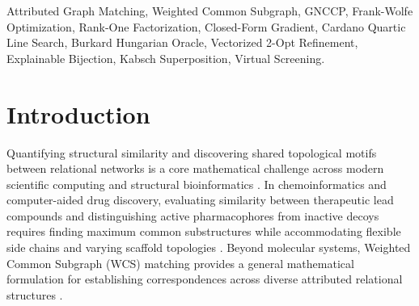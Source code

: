 \documentclass[conference]{IEEEtran}
\begin{document}
\begin{abstract}
$\mathcal{O}(N^{5.4})$ for prior GNCCP relaxations and $\mathcal{O}(N^{4.3})$ for classical spectral methods, running $19.3\times$ faster than RLX1 and scaling up to problem sizes $M = 60$ with sub-$25\,\text{ms}$ running times and $97.1\%$ matching accuracy. On real-world 3D molecular conformer benchmarks across 100 multi-seed trials evaluated with untrimmed full-atom RMSD, Fast-WCS achieves $49.8\%$ accuracy ($95\%$ CI: $[42.4, 57.1]\%$) with $\mathbf{42.0\%}$ sub-angstrom docking success ($< 1.0\,\text{\AA}$) in $30.7\,\text{ms}$, whereas optimal transport and quadratic assignment baselines (POT, FGW, SciPy FAQ) fail ($0.0\text{--}1.0\%$ sub-angstrom recovery, median RMSD $> 2.7\,\text{\AA}$). Finally, on pharmaceutical screening benchmarks (CYP19A1 Aromatase), Fast-WCS achieves an empirical $\mathbf{19.3\times}$ speedup over RLX1 (and up to $\mathbf{5,717.9\times}$ over numerical finite differences at $N = 100$) and produces a multi-scale hybrid kernel with superior screening enrichment (ROC-AUC = $0.884$, $\text{EF}_{1\%} = 8.5\times$ approaching the theoretical maximum ceiling of $10.0\times$ for a $10\%$ active base rate, compared to $6.4\times$ for ECFP4).
\end{abstract}

\begin{IEEEkeywords}
Attributed Graph Matching, Weighted Common Subgraph, GNCCP, Frank-Wolfe Optimization, Rank-One Factorization, Closed-Form Gradient, Cardano Quartic Line Search, Burkard Hungarian Oracle, Vectorized 2-Opt Refinement, Explainable Bijection, Kabsch Superposition, Virtual Screening.
\end{IEEEkeywords}


\section{Introduction}
\label{sec:intro}

Quantifying structural similarity and discovering shared topological motifs between relational networks is a core mathematical challenge across modern scientific computing and structural bioinformatics \cite{conte2004, bajorath2002}. In chemoinformatics and computer-aided drug discovery, evaluating similarity between therapeutic lead compounds and distinguishing active pharmacophores from inactive decoys requires finding maximum common substructures while accommodating flexible side chains and varying scaffold topologies \cite{ceriotti2014, ralaivola2005}. Beyond molecular systems, Weighted Common Subgraph (WCS) matching provides a general mathematical formulation for establishing correspondences across diverse attributed relational structures \cite{zaslavskiy2009, vishwanathan2010, leordeanu2005}.
\end{document}
